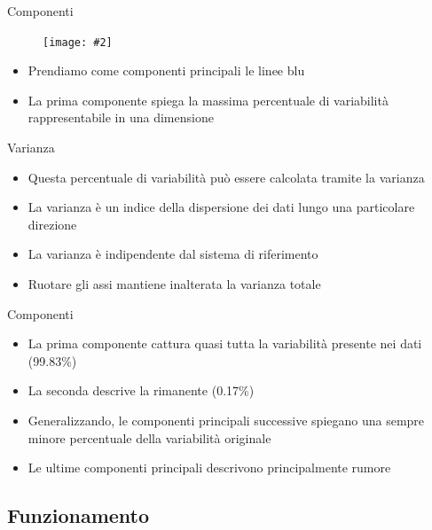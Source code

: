 \documentclass[xcolor={dvipsnames}]{beamer}
\newcommand{\figcen}[2]{
	\begin{figure}
		\begin{center}
			\texttt{[image: \#2]}
		\end{center}
	\end{figure}
}
\begin{document}
		\begin{frame}{Componenti}
			\figcen{.7\textwidth}{componenti}
			\begin{itemize}
				\item Prendiamo come componenti principali le linee blu
				\item La prima componente spiega la massima percentuale di variabilità rappresentabile in una dimensione
			\end{itemize}
		\end{frame}

		\begin{frame}{Varianza}
			\begin{itemize}
				\item Questa percentuale di variabilità può essere calcolata tramite la varianza
				\item La varianza è un indice della dispersione dei dati lungo una particolare direzione
				\item La varianza è indipendente dal sistema di riferimento
				\item Ruotare gli assi mantiene inalterata la varianza totale
			\end{itemize}
		\end{frame}

		\begin{frame}{Componenti}
			\begin{itemize}
				\item La prima componente cattura quasi tutta la variabilità presente nei dati (99.83\%)
				\item La seconda descrive la rimanente (0.17\%)
				\item Generalizzando, le componenti principali successive spiegano una sempre minore percentuale della variabilità originale
				\item Le ultime componenti principali descrivono principalmente rumore
			\end{itemize}
		\end{frame}

	\subsection{Funzionamento}
\end{document}
